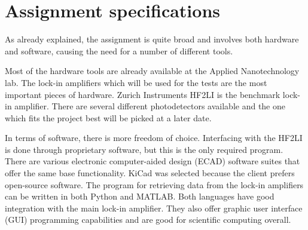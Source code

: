 \documentclass{report}
\begin{document}
	
	\section{Assignment specifications}\label{specifications}
	As already explained, the assignment is quite broad and involves both hardware and software, causing the need for a number of different tools. 
	
	Most of the hardware tools are already available at the Applied Nanotechnology lab. The lock-in amplifiers which will be used for the tests are the most important pieces of hardware. Zurich Instruments HF2LI is the benchmark lock-in amplifier. There are several different photodetectors available and the one which fits the project best will be picked at a later date. 
	
	In terms of software, there is more freedom of choice. Interfacing with the HF2LI is done through proprietary software, but this is the only required program. There are various electronic computer-aided design (ECAD) software suites that offer the same base functionality. KiCad was selected because the client prefers open-source software. The program for retrieving data from the lock-in amplifiers can be written in both Python and MATLAB. Both languages have good integration with the main lock-in amplifier. They also offer graphic user interface (GUI) programming capabilities and are good for scientific computing overall.
	
	
	
	
	
\end{document}
